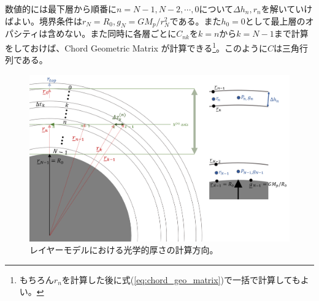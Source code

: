 数値的には最下層から順番に$n=N-1, N-2, \cdots, 0$について$\Delta h_n, r_n$を解いていけばよい。境界条件は$r_N = R_0, g_N = G M_p/r_N^2$である。また$h_0 = 0$として最上層のオパシティは含めない。また同時に各層ごとに$C_{nk}$を$k=n$から$k=N-1$まで計算をしておけば、Chord Geometric Matrix が計算できる\footnote{もちろん$r_n$を計算した後に式(\ref{eq:chord_geo_matrix})で一括で計算してもよい。}。このように$C$は三角行列である。

\begin{figure}[htb]
\begin{center}
\includegraphics[width=1.0\linewidth]{fig/transmission_coord.PNG}
\caption{レイヤーモデルにおける光学的厚さの計算方向。\label{fig:transmission_coord}}
\end{center}
\end{figure}
